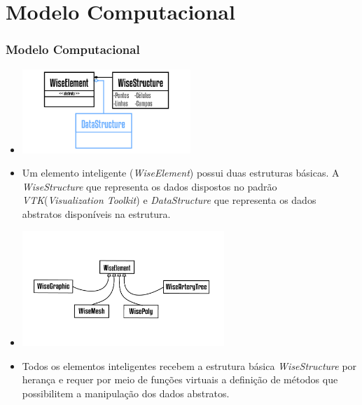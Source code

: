 \documentclass[10pt]{beamer}
\theoremstyle{remark}
\theoremstyle{definition}
\begin{document}
	\section{Modelo Computacional}
	\begin{frame}[allowframebreaks]
		\frametitle{Modelo Computacional}
		
		\begin{itemize}
			
			\item \includegraphics[width=0.5\textwidth]{images/WiseElement.png}
			
			\item Um elemento inteligente (\textit{WiseElement}) possui duas estruturas básicas. A \textit{WiseStructure} que representa os dados dispostos no padrão \textit{VTK}(\textit{Visualization Toolkit}) e \textit{DataStructure} que representa os dados abstratos disponíveis na estrutura.
			
		\end{itemize}
		
		\framebreak	
		
		\begin{itemize}
			
			\item \includegraphics[width=0.6\textwidth]{images/WiseElements.png}
			
			\item Todos os elementos inteligentes recebem a estrutura básica \textit{WiseStructure} por herança e requer por meio de funções virtuais a definição de métodos que possibilitem a manipulação dos dados abstratos.
			
		\end{itemize}
		

\end{frame}
\end{document}

